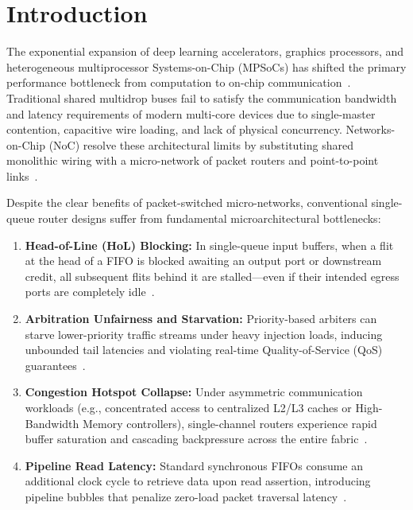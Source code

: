 \documentclass[conference]{IEEEtran}
\begin{document}
\section{Introduction}
\label{sec:intro}
The exponential expansion of deep learning accelerators, graphics processors, and heterogeneous multiprocessor Systems-on-Chip (MPSoCs) has shifted the primary performance bottleneck from computation to on-chip communication~\cite{dally2001route}. Traditional shared multidrop buses fail to satisfy the communication bandwidth and latency requirements of modern multi-core devices due to single-master contention, capacitive wire loading, and lack of physical concurrency. Networks-on-Chip (NoC) resolve these architectural limits by substituting shared monolithic wiring with a micro-network of packet routers and point-to-point links~\cite{dally2004principles}.

Despite the clear benefits of packet-switched micro-networks, conventional single-queue router designs suffer from fundamental microarchitectural bottlenecks:
\begin{enumerate}
    \item \textbf{Head-of-Line (HoL) Blocking:} In single-queue input buffers, when a flit at the head of a FIFO is blocked awaiting an output port or downstream credit, all subsequent flits behind it are stalled—even if their intended egress ports are completely idle~\cite{taheri2023adele}.
    \item \textbf{Arbitration Unfairness and Starvation:} Priority-based arbiters can starve lower-priority traffic streams under heavy injection loads, inducing unbounded tail latencies and violating real-time Quality-of-Service (QoS) guarantees~\cite{latif2023low}.
    \item \textbf{Congestion Hotspot Collapse:} Under asymmetric communication workloads (e.g., concentrated access to centralized L2/L3 caches or High-Bandwidth Memory controllers), single-channel routers experience rapid buffer saturation and cascading backpressure across the entire fabric~\cite{chen2024dynamic}.
    \item \textbf{Pipeline Read Latency:} Standard synchronous FIFOs consume an additional clock cycle to retrieve data upon read assertion, introducing pipeline bubbles that penalize zero-load packet traversal latency~\cite{bhargavi2024scalable}.
\end{enumerate}
\end{document}
